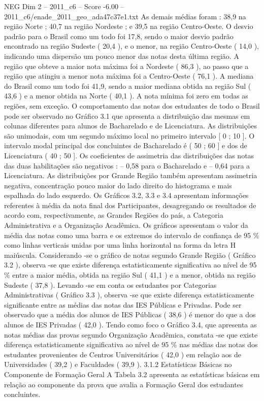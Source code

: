 \begin{textsample}{NEG Dim 2 – 2011\_c6 – Score -6.00 – 2011\_c6/enade\_2011\_geo\_ada47c37e1.txt}
As demais médias foram : 38,9 na região Norte ; 40,7 na região Nordeste ; e 39,5 na região Centro-Oeste.
O desvio padrão para o Brasil como um todo foi 17,8, sendo o maior desvio padrão encontrado na região Sudeste ( 20,4 ), e o menor, na região Centro-Oeste ( 14,0 ), indicando uma dispersão um pouco menor das notas desta última região.
A região que obteve a maior nota máxima foi a Nordeste ( 86,3 ), ao passo que a região que atingiu a menor nota máxima foi a Centro-Oeste ( 76,1 ).
A mediana do Brasil como um todo foi 41,9, sendo a maior mediana obtida na região Sul ( 43,6 ) e a menor obtida na Norte ( 40,1 ).
A nota mínima foi zero em todas as regiões, sem exceção.
O comportamento das notas dos estudantes de todo o Brasil pode ser observado no Gráfico 3.1 que apresenta a distribuição das mesmas em colunas diferentes para alunos de Bacharelado e de Licenciatura.
As distribuições são unimodais, com um segundo máximo local no primeiro intervalo [ 0 ; 10 ].
O intervalo modal principal dos concluintes de Bacharelado é ( 50 ; 60 ] e dos de Licenciatura ( 40 ; 50 ].
Os coeficientes de assimetria das distribuições das notas das duas habilitações são negativos : – 0,58 para o Bacharelado e – 0,64 para a Licenciatura.
As distribuições por Grande Região também apresentam assimetria negativa, concentração pouco maior do lado direito do histograma e mais espalhada do lado esquerdo.
Os Gráficos 3.2, 3.3 e 3.4 apresentam informações referentes à média da nota final dos Participantes, desagregando os resultados de acordo com, respectivamente, as Grandes Regiões do país, a Categoria Administrativa e a Organização Acadêmica.
Os gráficos apresentam o valor da média das notas como uma barra e os extremos do intervalo de confiança de 95 \% como linhas verticais unidas por uma linha horizontal na forma da letra H maiúscula.
Considerando -se o gráfico de notas segundo Grande Região ( Gráfico 3.2 ), observa -se que existe diferença estatisticamente significativa ao nível de 95 \% entre a maior média, obtida na região Sul ( 41,1 ) e a menor, obtida na região Sudeste ( 37,8 ).
Levando -se em conta os estudantes por Categorias Administrativas ( Gráfico 3.3 ), observa -se que existe diferença estatisticamente significante entre as médias das notas das IES Públicas e Privadas.
Pode ser observado que a média dos alunos de IES Públicas ( 38,6 ) é menor do que a dos alunos de IES Privadas ( 42,0 ).
Tendo como foco o Gráfico 3.4, que apresenta as notas médias das provas segundo Organização Acadêmica, constata -se que existe diferença estatisticamente significativa ao nível de 95 \% nas médias das notas dos estudantes provenientes de Centros Universitários ( 42,0 ) em relação aos de Universidades ( 39,2 ) e Faculdades ( 39,9 ). 3.1.2 Estatísticas Básicas no Componente de Formação Geral A Tabela 3.2 apresenta as estatísticas básicas em relação ao componente da prova que avalia a Formação Geral dos estudantes concluintes.

\end{textsample}
